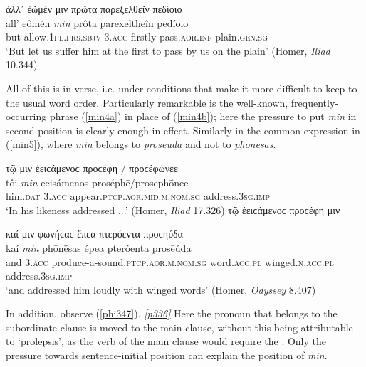 \begin{exe}
\ex ἀλλ᾽ ἐῶμέν {μιν} πρῶτα παρεξελθεῖν πεδίοιο\\
\gll all' eômén \emph{min} prôta parexeltheîn pedíoio\\
but allow.\textsc{1pl.prs.sbjv} \textsc{3.acc} firstly
pass.\textsc{aor.inf} plain.\textsc{gen.sg}\\
\trans `But let us suffer him at the first to pass by us on the plain' (Homer, \emph{Iliad} 10.344)
\label{min3}
\end{exe}

All of this is in verse, i.e. under conditions that make it more difficult to keep to the usual word order. Particularly remarkable is the well-known, frequently-occurring phrase (\ref{min4a}) in place of (\ref{min4b}); here the pressure to put \emph{min} in second position is clearly enough in effect. Similarly in the common expression in (\ref{min5}), where \emph{min} belongs to \emph{prosēuda} and not to \emph{phōnēsas}. 

\begin{exe}
\ex\begin{xlist}
\ex\label{min4a} τῷ {μιν} ἐειϲάμενοϲ προϲέφη / προϲέφώνεε\\
\gll tôi \emph{min} eeisámenos proséphē/prosephṓnee\\
him.\textsc{dat} \textsc{3.acc}
appear.\textsc{ptcp.aor.mid.m.nom.sg} address.\textsc{3sg.imp}\\
\trans `In his likeness addressed ...' (Homer, \emph{Iliad} 17.326)
\ex\label{min4b} τῷ ἐειϲάμενοϲ προϲέφη μιν
\end{xlist}
\end{exe}

\begin{exe}
\ex καί {μιν} φωνήϲαϲ ἔπεα πτερόεντα προϲηύδα\\
\gll kaí \emph{min} phōnḗsas épea pteróenta prosēúda\\
and \textsc{3.acc} produce-a-sound.\textsc{ptcp.aor.m.nom.sg} word.\textsc{acc.pl} winged.\textsc{n.acc.pl} address.\textsc{3sg.imp}\\
\trans `and addressed him loudly with winged words' (Homer, \emph{Odyssey} 8.407)
\label{min5}
\end{exe}

In addition, observe (\ref{phi347}). \hyperlink{p336}{\emph{[p336]}} Here the pronoun that belongs to the subordinate clause is moved to the main clause, without this being attributable to `prolepsis', as the verb of the main clause would require the . Only the pressure towards sentence-initial position can explain the position of \emph{min}.

